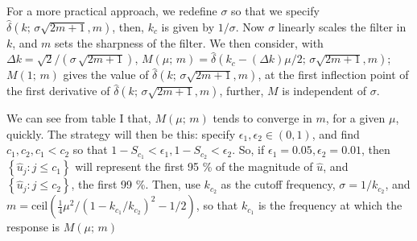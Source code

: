 \documentclass[amsmath,amssymb,floatfix]{revtex4}
\numberwithin{equation}{section}
\newcommand{\ceil}[0]{ \textrm{ceil} }
\begin{document}
For a more practical approach, we redefine $\sigma$ so that we specify $\hat{\delta} (k; \, \sigma \sqrt{2 m+1}, m)$, then, $k_c$ is given by $1/\sigma$. Now $\sigma$ linearly scales the filter in $k$, and $m$ sets the sharpness of the filter. We then consider, with  $\Delta k = \sqrt{2}/(\sigma \, \sqrt{2 m+1})$, $M(\mu ; \, m) = \hat{\delta} (k_c-(\Delta k)\mu /2; \, \sigma \sqrt{2 m+1}, m)$; $M(1; \, m)$ gives the value of $\hat{\delta} (k; \, \sigma \sqrt{2 m+1}, m)$, at the first inflection point of the first derivative of  $\hat{\delta} (k; \, \sigma \sqrt{2 m+1}, m)$, further, $M$ is independent of $\sigma$.

We can see from table I that, $M(\mu; \, m)$ tends to converge in $m$, for a given $\mu$, quickly. The strategy will then be this: specify $\epsilon_1,\epsilon_2 \in (0,1)$, and find $c_1,c_2, c_1<c_2$ so that $1-S_{c_1} < \epsilon_1 ,1-S_{c_2} < \epsilon_2 $. So, if $\epsilon_1 = 0.05,\epsilon_2 = 0.01$, 
then $\left\{ \hat{u}_j : j \le c_1 \right\}$ will represent the first 95 \%  of the magnitude of $\hat{u}$, and $\left\{ \hat{u}_j : j \le c_2 \right\}$, the first 99 \%. Then, use $k_{c_2}$ as the cutoff frequency, $\sigma = 1/k_{c_2}$, and $m = \ceil{ \left( \frac{1}{4}\mu^2/(1-k_{c_1}/k_{c_2})^2-1/2 \right)}$, so that $k_{c_1}$ is the frequency at which the response is $M(\mu; \, m)$
\end{document}
